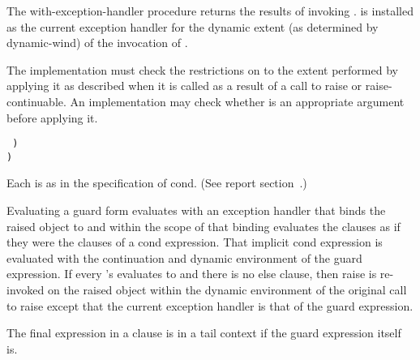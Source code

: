\begin{entry}{%
}

  The {\cf
with-exception-handler} procedure returns the results of invoking
.   is installed as the current
exception handler for the dynamic extent (as determined by {\cf
  dynamic-wind}) of the invocation of .

\implresp The implementation must check the restrictions on
 to the extent performed by applying it as described
when it is called as a result of a call to {\cf raise} or {\cf
  raise-continuable}.
An
implementation may check whether  is an appropriate argument
before applying it.
\end{entry}

\begin{entry}{%
{\tt\obeyspaces%
\hspace*{3em}  \dotsfoo)\\
\hspace*{2em})}\\
\litprotonoindex{=>}
}
\schindex{=>}

\syntax
Each  is as in the specification of {\cf cond}.
(See report section~.)

\semantics 
Evaluating a {\cf guard} form evaluates  with an exception
handler that binds the raised object to  and within the scope of
that binding evaluates the clauses as if they were the clauses of a
{\cf cond} expression. That implicit {\cf cond} expression is evaluated with the
continuation and dynamic environment of the {\cf guard} expression. If every
's  evaluates to \schfalse{} and there
is no {\cf else} clause, then
{\cf raise} is re-invoked on the raised object within the dynamic
environment of the original call to {\cf raise} except that the current
exception handler is that of the {\cf guard} expression.  

The final expression in a  clause is in a tail context if
the {\cf guard} expression itself is.
\end{entry}

